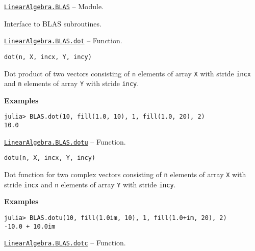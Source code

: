 \hypertarget{16764328874035557229}{}
\hyperlink{16764328874035557229}{\texttt{LinearAlgebra.BLAS}}  -- {Module.}

\begin{adjustwidth}{2em}{0pt}

Interface to BLAS subroutines.



\end{adjustwidth}
\hypertarget{18272264626945379268}{}
\hyperlink{18272264626945379268}{\texttt{LinearAlgebra.BLAS.dot}}  -- {Function.}

\begin{adjustwidth}{2em}{0pt}


\begin{verbatim}
dot(n, X, incx, Y, incy)
\end{verbatim}

Dot product of two vectors consisting of \texttt{n} elements of array \texttt{X} with stride \texttt{incx} and \texttt{n} elements of array \texttt{Y} with stride \texttt{incy}.

\textbf{Examples}


\begin{verbatim}
julia> BLAS.dot(10, fill(1.0, 10), 1, fill(1.0, 20), 2)
10.0
\end{verbatim}



\end{adjustwidth}
\hypertarget{17189447686500977816}{}
\hyperlink{17189447686500977816}{\texttt{LinearAlgebra.BLAS.dotu}}  -- {Function.}

\begin{adjustwidth}{2em}{0pt}


\begin{verbatim}
dotu(n, X, incx, Y, incy)
\end{verbatim}

Dot function for two complex vectors consisting of \texttt{n} elements of array \texttt{X} with stride \texttt{incx} and \texttt{n} elements of array \texttt{Y} with stride \texttt{incy}.

\textbf{Examples}


\begin{verbatim}
julia> BLAS.dotu(10, fill(1.0im, 10), 1, fill(1.0+im, 20), 2)
-10.0 + 10.0im
\end{verbatim}



\end{adjustwidth}
\hypertarget{14215820815183043302}{}
\hyperlink{14215820815183043302}{\texttt{LinearAlgebra.BLAS.dotc}}  -- {Function.}


